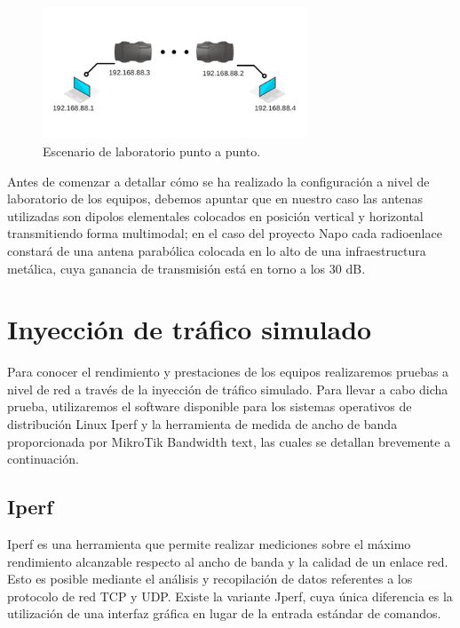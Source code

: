 \begin{figure}[H]
	\centering
	\includegraphics[width=0.7\textwidth]{img/escenario.png}
	\caption{Escenario de laboratorio punto a punto.}
	\label{enlace}
\end{figure}

Antes de comenzar a detallar cómo se ha realizado la configuración a nivel de laboratorio de los equipos, debemos apuntar que en nuestro caso las antenas utilizadas son dipolos elementales colocados en posición vertical y horizontal transmitiendo forma multimodal; en el caso del proyecto Napo cada radioenlace constará de una antena parabólica colocada en lo alto de una infraestructura metálica, cuya ganancia de transmisión está en torno a los 30 dB. \\

\section{Inyección de tráfico simulado}
Para conocer el rendimiento y prestaciones de los equipos realizaremos pruebas a nivel de red a través de la inyección de tráfico simulado. Para llevar a cabo dicha prueba, utilizaremos el software disponible para los sistemas operativos de distribución Linux Iperf y la herramienta de medida de ancho de banda proporcionada por MikroTik Bandwidth text, las cuales se detallan brevemente a continuación.\\

\subsection{Iperf}
Iperf \cite{Iperf} es una herramienta que permite realizar mediciones sobre el máximo rendimiento alcanzable respecto al ancho de banda y la calidad de un enlace red. Esto es posible mediante el análisis y recopilación de datos referentes a los protocolo de red TCP y UDP. Existe la variante Jperf, cuya única diferencia es la utilización de una interfaz gráfica en lugar de la entrada estándar de comandos.\\

